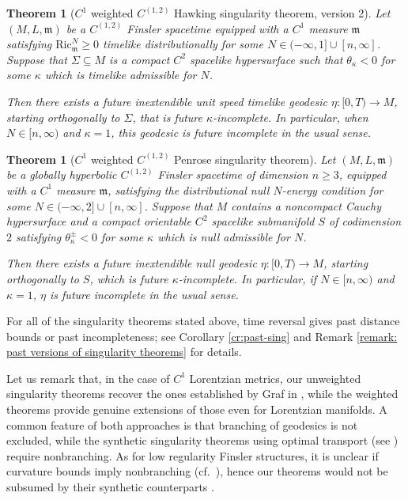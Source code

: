 \documentclass[a4paper,11pt]{article}
\numberwithin{equation}{section}
\theoremstyle{definition}
\theoremstyle{plain}
\newtheorem{Theorem}[Definition]{Theorem}
\newcommand{\Ric}{\mathrm{Ric}}
\begin{document}
\begin{Theorem}[$C^1$ weighted $C^{(1,2)}$ Hawking singularity theorem, version 2]
Let $(M,L,\mathfrak m)$ be a $C^{(1,2)}$ Finsler spacetime equipped with a $C^1$ measure $\mathfrak m$ satisfying $\Ric^N_{\mathfrak m}\geq0$ timelike distributionally for some $N\in(-\infty,1]\cup[n,\infty]$.
Suppose that $\Sigma\subseteq M$ is a compact $C^2$ spacelike hypersurface such that $\theta_\kappa<0$ for some $\kappa$ which is timelike admissible for $N$.

Then there exists a future inextendible unit speed timelike geodesic $\eta:[0,T)\to M$, starting orthogonally to $\Sigma$, that is future $\kappa$-incomplete.
In particular, when $N\in[n,\infty)$ and $\kappa=1$, this geodesic is future incomplete in the usual sense.
\end{Theorem}

\begin{Theorem}[$C^1$ weighted $C^{(1,2)}$ Penrose singularity theorem]
Let $(M,L,\mathfrak m)$ be a globally hyperbolic $C^{(1,2)}$ Finsler spacetime of dimension $n\geq3$, equipped with a $C^1$ measure  $\mathfrak m$, satisfying the distributional null $N$-energy condition for some $N\in(-\infty,2]\cup[n,\infty]$.
Suppose that $M$ contains a noncompact Cauchy hypersurface and a compact orientable $C^2$ spacelike submanifold $S$ of codimension $2$ satisfying $\theta_\kappa^\pm<0$ for some $\kappa$ which is null admissible for $N$. 

Then there exists a future inextendible null geodesic $\eta:[0,T)\to M$, starting orthogonally to $S$, which is future $\kappa$-incomplete.
In particular, if $N\in[n,\infty)$ and $\kappa=1$, $\eta$ is future incomplete in the usual sense.
\end{Theorem}

For all of the singularity theorems stated above, time reversal gives past distance bounds or past incompleteness; see Corollary \ref{cr:past-sing} and Remark \ref{remark: past versions of singularity theorems} for details.

Let us remark that, in the case of $C^1$ Lorentzian metrics, our unweighted singularity theorems recover the ones established by Graf in \cite{Graf-SingularityC1}, while the weighted theorems provide genuine extensions of those even for Lorentzian manifolds. 
A common feature of both approaches is that branching of geodesics is not excluded, while the synthetic singularity theorems using optimal transport (see \cite{CavallettiMondino, CavallettiManiniMondinosynthetic}) require nonbranching.
As for low regularity Finsler structures, it is unclear if curvature bounds imply nonbranching (cf.\ \cite{OhtaBranching, MagnaboscoCDbranching}), hence our theorems would not be subsumed by their synthetic counterparts \cite{CavallettiMondino, CavallettiManiniMondinosynthetic}.
\end{document}
